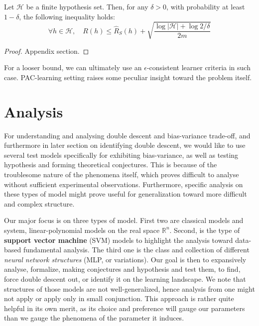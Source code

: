 \documentclass[10pt]{article} %
\begin{document}
\begin{theorem}\label{thm:theorem_inconsistent}
    Let $\mathcal{H}$ be a finite hypothesis set. Then, for any $\delta > 0$, with probability at least $1-\delta$, the following inequality holds: 
    \begin{equation}
        \forall h \in \mathcal{H}, \quad R(h) \leq \hat{R}_S (h) + \sqrt{\frac{\log{|\mathcal{H}|}+ \log{2/\delta}}{2m}}
    \end{equation}
\end{theorem}
\begin{proof}
    Appendix section.
\end{proof}

For a looser bound, we can ultimately use an $\epsilon$-consistent learner criteria in such case. PAC-learning setting raises some peculiar insight toward the problem itself. 

\section{Analysis}

For understanding and analysing double descent and bias-variance trade-off, and furthermore in later section on identifying double descent, we would like to use several test models specifically for exhibiting bias-variance, as well as testing hypothesis and forming theoretical conjectures. This is because of the troublesome nature of the phenomena itself, which proves difficult to analyse without sufficient experimental observations. Furthermore, specific analysis on these types of model might prove useful for generalization toward more difficult and complex structure. 

Our major focus is on three types of model. First two are classical models and system, linear-polynomial models on the real space $\mathbb{R}^{n}$. Second, is the type of \textbf{support vector machine} (SVM) models to highlight the analysis toward data-based fundamental analysis. The third one is the class and collection of different \textit{neural network structures} (MLP, or variations). Our goal is then to expansively analyse, formalize, making conjectures and hypothesis and test them, to find, force double descent out, or identify it on the learning landscape. We note that structures of those models are not well-generalized, hence analysis from one might not apply or apply only in small conjunction. This approach is rather quite helpful in its own merit, as its choice and preference will gauge our parameters than we gauge the phenomena of the parameter it induces. 
\end{document}
